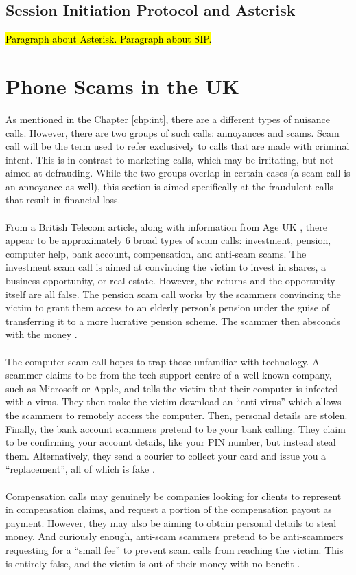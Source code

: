\documentclass[main.tex]{subfiles}
\begin{document}
\subsection{Session Initiation Protocol and Asterisk}
\hl{Paragraph about Asterisk. Paragraph about SIP.}

\section{Phone Scams in the UK}
As mentioned in the Chapter \ref{chp:int}, there are a different types of nuisance calls. However, there are two groups of such calls: annoyances and scams. Scam call will be the term used to refer exclusively to calls that are made with criminal intent. This is in contrast to marketing calls, which may be irritating, but not aimed at defrauding. While the two groups overlap in certain cases (a scam call is an annoyance as well), this section is aimed specifically at the fraudulent calls that result in financial loss.
\\\\
From a British Telecom \cite{bt-types} article, along with information from Age UK \cite{ageuk-types}, there appear to be approximately 6 broad types of scam calls: investment, pension, computer help, bank account, compensation, and anti-scam scams. The investment scam call is aimed at convincing the victim to invest in shares, a business opportunity, or real estate. However, the returns and the opportunity itself are all false. The pension scam call works by the scammers convincing the victim to grant them access to an elderly person's pension under the guise of transferring it to a more lucrative pension scheme. The scammer then absconds with the money \cite{bt-types}.
\\\\
The computer scam call hopes to trap those unfamiliar with technology. A scammer claims to be from the tech support centre of a well-known company, such as Microsoft or Apple, and tells the victim that their computer is infected with a virus. They then make the victim download an ``anti-virus'' which allows the scammers to remotely access the computer. Then, personal details are stolen. Finally, the bank account scammers pretend to be your bank calling. They claim to be confirming your account details, like your PIN number, but instead steal them. Alternatively, they send a courier to collect your card and issue you a ``replacement'', all of which is fake \cite{bt-types}.
\\\\
Compensation calls may genuinely be companies looking for clients to represent in compensation claims, and request a portion of the compensation payout as payment. However, they may also be aiming to obtain personal details to steal money. And curiously enough, anti-scam scammers pretend to be anti-scammers requesting for a ``small fee'' to prevent scam calls from reaching the victim. This is entirely false, and the victim is out of their money with no benefit \cite{ageuk-types}.
\end{document}
